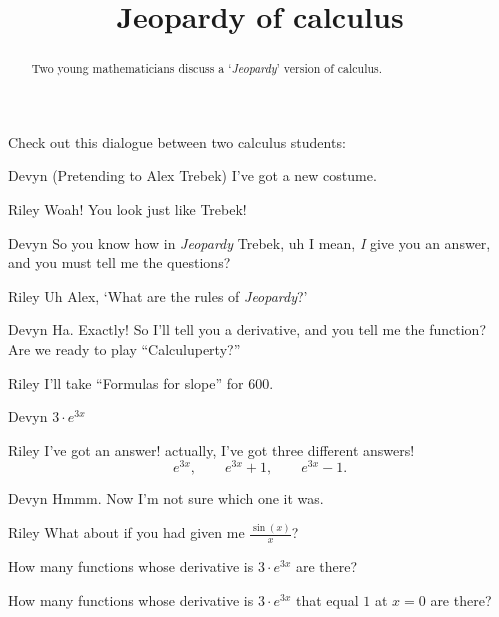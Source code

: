 \documentclass{ximera}
\title[Break-Ground:]{Jeopardy of calculus}
\begin{document}
\begin{abstract}
  Two young mathematicians discuss a `\textit{Jeopardy}' version of calculus.
\end{abstract}
\maketitle

Check out this dialogue between two calculus students:


\begin{dialogue}
\item[Devyn] (Pretending to Alex Trebek) I've got a new costume.
\item[Riley] Woah! You look just like Trebek!
\item[Devyn] So you know how in \textit{Jeopardy} Trebek, uh I mean, \textit{I} give you an answer, and you must tell me the questions?
\item[Riley] Uh Alex, `What are the rules of \textit{Jeopardy}?'
\item[Devyn] Ha. Exactly! So I'll tell you a derivative, and you tell
  me the function? Are we ready to play ``Calculuperty?''
\item[Riley] I'll take ``Formulas for slope'' for $600$.
\item[Devyn] $3\cdot e^{3x}$  
\item[Riley] I've got an answer!  actually, I've got three different answers!
  \[
  e^{3x},\qquad e^{3x}+1,\qquad e^{3x}-1.
  \]
\item[Devyn] Hmmm. Now I'm not sure which one it was.
\item[Riley] What about if you had given me $\frac{\sin(x)}{x}$?
\end{dialogue}


\begin{problem}
  How many functions whose derivative is $3\cdot e^{3x}$ are there?
  \begin{multipleChoice}
  \end{multipleChoice}
\end{problem}

\begin{problem}
  How many functions whose derivative is $3\cdot e^{3x}$ that equal
  $1$ at $x=0$ are there?
  \begin{multipleChoice}
  \end{multipleChoice}
\end{problem}



\end{document}
